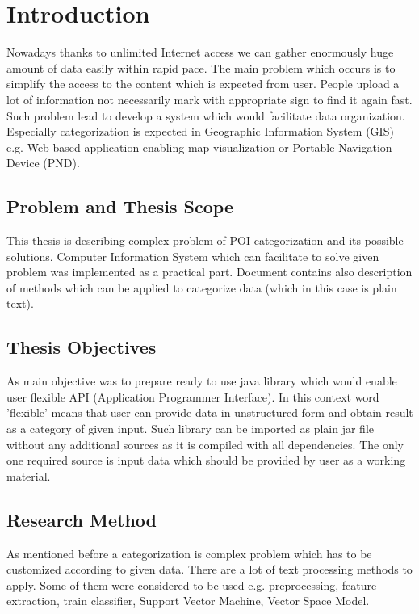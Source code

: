 \chapter{Introduction} \label{chap.introduction} 
{Nowadays thanks to unlimited Internet access we can gather enormously huge amount of data easily within rapid pace. The main problem which occurs is to simplify the access to the content which is expected from user. People upload a lot of information not necessarily mark with appropriate sign to find it again fast. Such problem lead to develop a system which would facilitate data organization. Especially categorization is expected in Geographic Information System (GIS) e.g. Web-based application enabling map visualization or Portable Navigation Device (PND).}


\section{Problem and Thesis Scope}
This thesis is describing complex problem of POI categorization and its possible solutions. Computer Information System which can facilitate to solve given problem was implemented as a practical part. Document contains also description of methods which can be applied to categorize data (which in this case is plain text). 

\section{Thesis Objectives}
As main objective was to prepare ready to use java library which would enable user flexible API (Application Programmer Interface). In this context word 'flexible' means that user can provide data in unstructured form and obtain result as a category of given input. Such library can be imported as plain jar file without any additional sources as it is compiled with all dependencies. The only one required source is input data which should be provided by user as a working material. 

\section{Research Method}
As mentioned before a categorization is complex problem which has to be customized according to given data. There are a lot of text processing methods to apply. Some of them were considered to be used e.g. preprocessing, feature extraction, train classifier, Support Vector Machine, Vector Space Model.

